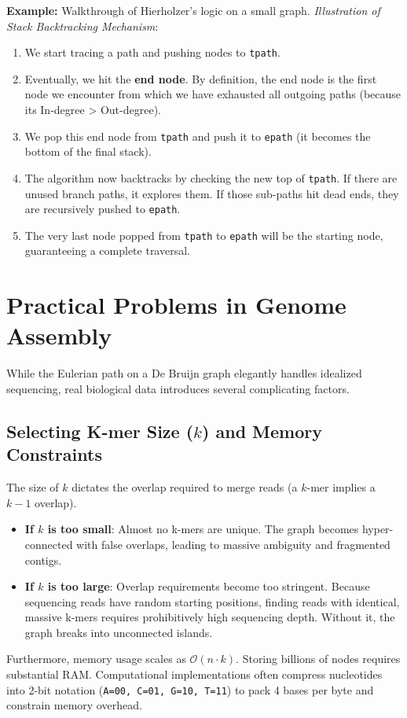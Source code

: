 \textbf{Example:} Walkthrough of Hierholzer's logic on a small graph.
\textit{Illustration of Stack Backtracking Mechanism}:
\begin{enumerate}
    \item We start tracing a path and pushing nodes to \texttt{tpath}.
    \item Eventually, we hit the \textbf{end node}. By definition, the end node is the first node we encounter from which we have exhausted all outgoing paths (because its In-degree > Out-degree). 
    \item We pop this end node from \texttt{tpath} and push it to \texttt{epath} (it becomes the bottom of the final stack).
    \item The algorithm now backtracks by checking the new top of \texttt{tpath}. If there are unused branch paths, it explores them. If those sub-paths hit dead ends, they are recursively pushed to \texttt{epath}.
    \item The very last node popped from \texttt{tpath} to \texttt{epath} will be the starting node, guaranteeing a complete traversal.
\end{enumerate}


\section{Practical Problems in Genome Assembly}
While the Eulerian path on a De Bruijn graph elegantly handles idealized sequencing, real biological data introduces several complicating factors.

\subsection{Selecting K-mer Size ($k$) and Memory Constraints}
The size of $k$ dictates the overlap required to merge reads (a $k$-mer implies a $k-1$ overlap).
\begin{itemize}
    \item \textbf{If $k$ is too small}: Almost no k-mers are unique. The graph becomes hyper-connected with false overlaps, leading to massive ambiguity and fragmented contigs.
    \item \textbf{If $k$ is too large}: Overlap requirements become too stringent. Because sequencing reads have random starting positions, finding reads with identical, massive k-mers requires prohibitively high sequencing depth. Without it, the graph breaks into unconnected islands.
\end{itemize}
\sta Furthermore, memory usage scales as $\mathcal{O}(n \cdot k)$. Storing billions of nodes requires substantial RAM. Computational implementations often compress nucleotides into 2-bit notation (\texttt{A=00, C=01, G=10, T=11}) to pack 4 bases per byte and constrain memory overhead.

